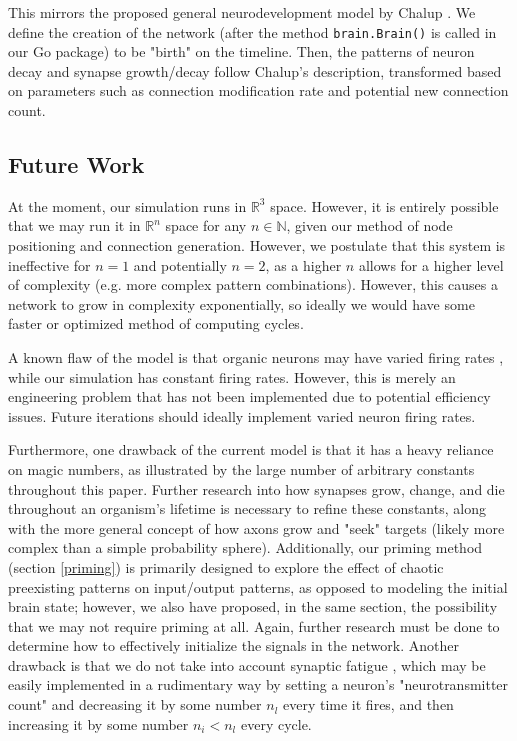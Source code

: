 \documentclass[12pt]{article}
\begin{document}
This mirrors the proposed general neurodevelopment model by Chalup \cite{neurodev}.  We define the creation of the network (after the method \texttt{brain.Brain()} is called in our Go package) to be "birth" on the timeline.  Then, the patterns of neuron decay and synapse growth/decay follow Chalup's description, transformed based on parameters such as connection modification rate and potential new connection count.

\subsection{Future Work} \label{future}

At the moment, our simulation runs in $\mathbb{R}^3$ space.  However, it is entirely possible that we may run it in $\mathbb{R}^n$ space for any $n \in \mathbb{N}$, given our method of node positioning and connection generation.  However, we postulate that this system is ineffective for $n=1$ and potentially $n=2$, as a higher $n$ allows for a higher level of complexity (e.g. more complex pattern combinations).  However, this causes a network to grow in complexity exponentially, so ideally we would have some faster or optimized method of computing cycles.

A known flaw of the model is that organic neurons may have varied firing rates \cite{firingrates}, while our simulation has constant firing rates.  However, this is merely an engineering problem that has not been implemented due to potential efficiency issues.  Future iterations should ideally implement varied neuron firing rates.

Furthermore, one drawback of the current model is that it has a heavy reliance on magic numbers, as illustrated by the large number of arbitrary constants throughout this paper.  Further research into how synapses grow, change, and die throughout an organism's lifetime is necessary to refine these constants, along with the more general concept of how axons grow and "seek" targets (likely more complex than a simple probability sphere).  Additionally, our priming method (section \ref{priming}) is primarily designed to explore the effect of chaotic preexisting patterns on input/output patterns, as opposed to modeling the initial brain state; however, we also have proposed, in the same section, the possibility that we may not require priming at all.  Again, further research must be done to determine how to effectively initialize the signals in the network.  Another drawback is that we do not take into account synaptic fatigue \cite{synapticfatigue}, which may be easily implemented in a rudimentary way by setting a neuron's "neurotransmitter count" and decreasing it by some number $n_l$ every time it fires, and then increasing it by some number $n_i < n_l$ every cycle.
\end{document}
